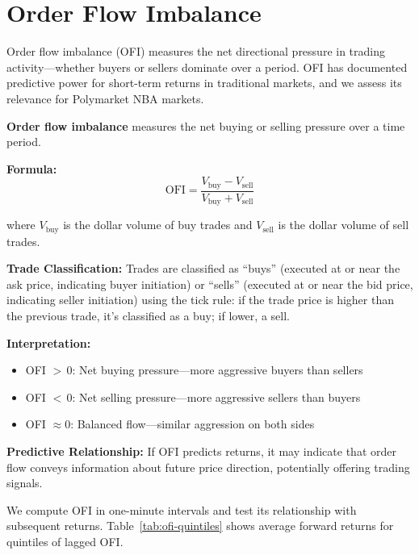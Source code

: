 \section{Order Flow Imbalance}

Order flow imbalance (OFI) measures the net directional pressure in trading activity---whether buyers or sellers dominate over a period. OFI has documented predictive power for short-term returns in traditional markets, and we assess its relevance for Polymarket NBA markets.

\begin{methodbox}
\textbf{Order flow imbalance} measures the net buying or selling pressure over a time period.

\textbf{Formula:}
\begin{equation}
\text{OFI} = \frac{V_{\text{buy}} - V_{\text{sell}}}{V_{\text{buy}} + V_{\text{sell}}}
\end{equation}

where $V_{\text{buy}}$ is the dollar volume of buy trades and $V_{\text{sell}}$ is the dollar volume of sell trades.

\textbf{Trade Classification:} Trades are classified as ``buys'' (executed at or near the ask price, indicating buyer initiation) or ``sells'' (executed at or near the bid price, indicating seller initiation) using the tick rule: if the trade price is higher than the previous trade, it's classified as a buy; if lower, a sell.

\textbf{Interpretation:}
\begin{itemize}
    \item OFI ${>}\,0$: Net buying pressure---more aggressive buyers than sellers
    \item OFI ${<}\,0$: Net selling pressure---more aggressive sellers than buyers
    \item OFI $\approx 0$: Balanced flow---similar aggression on both sides
\end{itemize}

\textbf{Predictive Relationship:} If OFI predicts returns, it may indicate that order flow conveys information about future price direction, potentially offering trading signals.
\end{methodbox}

We compute OFI in one-minute intervals and test its relationship with subsequent returns. Table~\ref{tab:ofi-quintiles} shows average forward returns for quintiles of lagged OFI.

